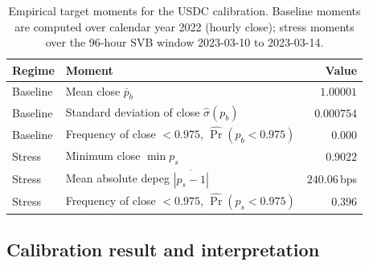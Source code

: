 \begin{table}[H]
\centering
\caption{Empirical target moments for the USDC calibration. Baseline moments are computed over calendar year 2022 (hourly close); stress moments over the 96-hour SVB window 2023-03-10 to 2023-03-14.}\label{tab:moments_targets}
\begin{tabular}{llr}
\toprule
Regime & Moment & Value \\
\midrule
Baseline & Mean close $\bar p_b$                                 & $1.00001$       \\
Baseline & Standard deviation of close $\hat\sigma(p_b)$          & $0.000754$      \\
Baseline & Frequency of close $< 0.975$, $\widehat{\Pr}(p_b<0.975)$ & $0.000$       \\
\midrule
Stress   & Minimum close $\min p_s$                              & $0.9022$        \\
Stress   & Mean absolute depeg $\overline{|p_s-1|}$               & $240.06$\,bps   \\
Stress   & Frequency of close $< 0.975$, $\widehat{\Pr}(p_s<0.975)$ & $0.396$       \\
\bottomrule
\end{tabular}
\end{table}

\subsection{Calibration result and interpretation}\label{sub:interp}

